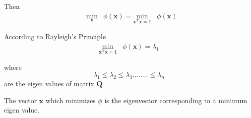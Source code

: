 Then
\begin{equation*}
\begin{aligned}
& \underset{\mathbf{x}} {\text{min}}& \phi(\mathbf{x})= \underset{\mathbf{{x}^{T}x=1}} {\text{min}} & \phi(\mathbf{x})
\end{aligned}
\end{equation*}

According to Rayleigh's Principle
\begin{equation*}
\begin{aligned}
\underset{\mathbf{{x}^{T}\mathbf{x}=1}} {\text{min}} & \phi(\mathbf{x} ) = \lambda_1
\end{aligned}
\end{equation*}

where $$ \lambda_1\leq\lambda_2\leq\lambda_3........\leq\lambda_n$$ are the eigen values of matrix  $\mathbf{Q}$

The vector $\mathbf{x}$ which minimizes $\phi$ is the eigenvector corresponding to a minimum eigen value.
% 